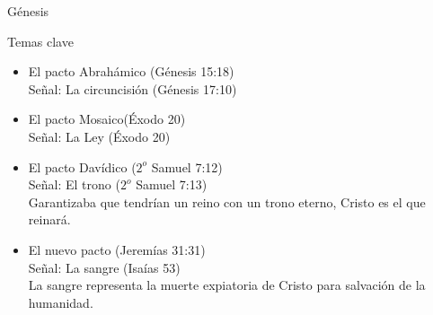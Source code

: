 \begin{section}{Génesis}
\begin{subsection}{Temas clave}
\begin{itemize}
			\item	El pacto Abrahámico (Génesis 15:18)\\
				Señal: La circuncisión (Génesis 17:10)


			\item	El pacto Mosaico(Éxodo 20)\\
				Señal: La Ley (Éxodo 20)

			\item	El pacto Davídico ($2^o$ Samuel 7:12)\\
				Señal: El trono ($2^o$ Samuel 7:13)\\
				Garantizaba que tendrían un reino con un trono eterno, Cristo es el que reinará.


			\item	El nuevo pacto (Jeremías 31:31)\\
				Señal: La sangre (Isaías 53)\\
				La sangre representa la muerte expiatoria de Cristo para salvación de la humanidad.
			

		\end{itemize}
	\end{subsection}
\end{section}

%


